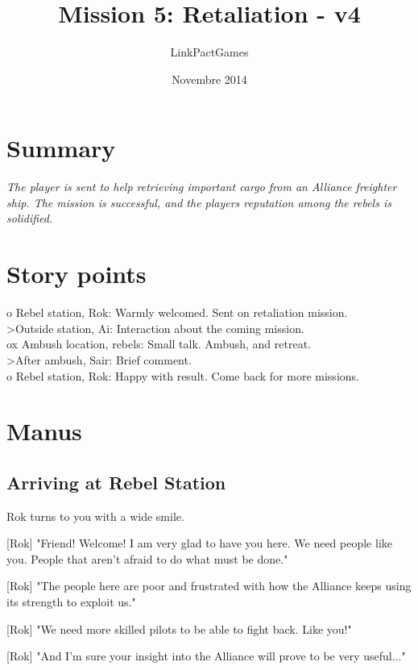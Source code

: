 \documentclass[a4paper,12pt]{article}
\begin{document}
\title{Mission 5: Retaliation - v4}
\author{LinkPactGames}
\date{Novembre 2014}
\maketitle

\section{Summary}

\textit{The player is sent to help retrieving important cargo from an
Alliance freighter ship. The mission is successful, and the
players reputation among the rebels is solidified.}

\section{Story points}

o Rebel station, Rok: Warmly welcomed. Sent on retaliation mission.\\
\textgreater Outside station, Ai: Interaction about the coming mission.\\
ox Ambush location, rebels: Small talk. Ambush, and retreat.\\
\textgreater After ambush, Sair: Brief comment.\\
o Rebel station, Rok: Happy with result. Come back for more missions.\\

\section{Manus}

\subsection{Arriving at Rebel Station}

Rok turns to you with a wide smile. 

[Rok] "Friend! Welcome! I am very glad to have you here. We need people like you.
People that aren't afraid to do what must be done."

[Rok] "The people here are poor and frustrated with how the Alliance keeps using its strength
to exploit us." 

[Rok] "We need more skilled pilots to be able to fight back. Like you!" 

[Rok] "And I'm sure your insight into the Alliance will prove to be very useful..."
\end{document}
